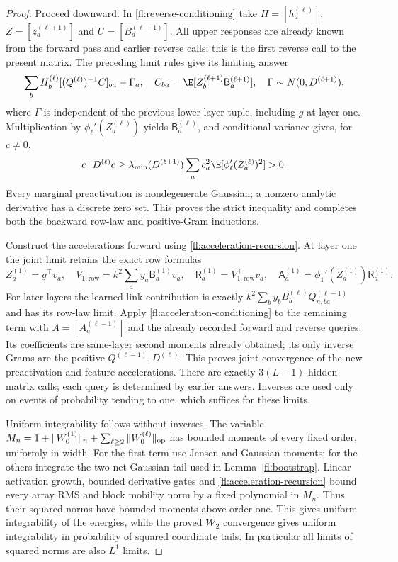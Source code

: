\begin{proof}
Proceed downward. In \eqref{fl:reverse-conditioning} take
$H=[h_a^{(\ell)}]$, $Z=[z_a^{(\ell+1)}]$ and
$U=[B_a^{(\ell+1)}]$. All upper responses are already known from the
forward pass and earlier reverse calls; this is the first reverse call to
the present matrix. The preceding limit rules give its limiting answer
\[
 \sum_bH_b^{(\ell)}[(Q^{(\ell)})^{-1}C]_{ba}+\Gamma_a,
 \quad C_{ba}=\E[Z_b^{(\ell+1)}\mathsf B_a^{(\ell+1)}],
 \quad\Gamma\sim N(0,D^{(\ell+1)}),
\]
where $\Gamma$ is independent of the previous lower-layer tuple, including
$g$ at layer one. Multiplication by $\phi_\ell'(Z_a^{(\ell)})$ yields
$\mathsf B_a^{(\ell)}$, and conditional variance gives, for $c\ne0$,
\[
 c^\top D^{(\ell)}c\ge\lambda_{\min}(D^{(\ell+1)})
       \sum_a c_a^2\E[\phi_\ell'(Z_a^{(\ell)})^2]>0.
\]
Every marginal preactivation is nondegenerate Gaussian; a nonzero analytic
derivative has a discrete zero set. This proves the strict inequality and
completes both the backward row-law and positive-Gram inductions.

Construct the accelerations forward using \eqref{fl:acceleration-recursion}.
At layer one the joint limit retains the exact row formulas
\[
 Z_a^{(1)}=g^\top v_a,\quad
 V_{1,\mathrm{row}}=k^2\sum_a y_a\mathsf B_a^{(1)}v_a,\quad
 \mathsf R_a^{(1)}=V_{1,\mathrm{row}}^\top v_a,\quad
 \mathsf A_a^{(1)}=\phi_1'(Z_a^{(1)})\mathsf R_a^{(1)}.
\]
For later layers the learned-link contribution is exactly
$k^2\sum_b y_bB_b^{(\ell)}Q_{n,ba}^{(\ell-1)}$ and has its row-law
limit. Apply \eqref{fl:acceleration-conditioning} to the remaining term
with $A=[A_a^{(\ell-1)}]$ and the already recorded forward and reverse
queries. Its coefficients are same-layer second moments already obtained;
its only inverse Grams are the positive $Q^{(\ell-1)},D^{(\ell)}$.
This proves joint convergence of the new preactivation and feature
accelerations. There are exactly $3(L-1)$ hidden-matrix calls; each query
is determined by earlier answers. Inverses are used only on events of
probability tending to one, which suffices for these limits.

Uniform integrability follows without inverses. The variable
$M_n=1+\|W_0^{(1)}\|_n+\sum_{\ell\ge2}\|W_0^{(\ell)}\|_{\rm op}$
has bounded moments of every fixed order, uniformly in width. For the first
term use Jensen and Gaussian moments; for the others integrate the two-net
Gaussian tail used in Lemma~\ref{fl:bootstrap}. Linear activation growth,
bounded derivative gates and \eqref{fl:acceleration-recursion} bound every
array RMS and block mobility norm by a fixed polynomial in $M_n$.
Thus their squared norms have bounded moments above order one. This gives
uniform integrability of the energies, while the proved $\mathcal W_2$
convergence gives uniform integrability in probability of squared coordinate
tails. In particular all limits of squared norms are also $L^1$ limits.


\end{proof}
